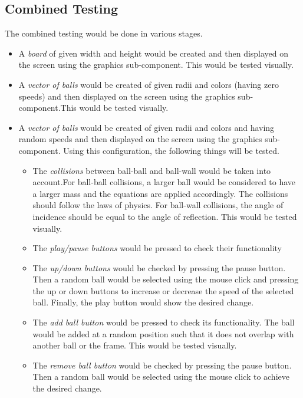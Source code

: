 \documentclass{article}
\begin{document}
\subsection{Combined Testing}
The combined testing would be done in various stages.
\begin{itemize}
\item A \textit{board} of given width and height would be created and then displayed on the screen using the graphics sub-component. This would be tested visually.
\item A \textit{vector of balls} would be created of given radii and colors (having zero speeds) and then displayed on the screen using the graphics sub-component.This would be tested visually.
\item A \textit{vector of balls} would be created of given radii and colors
and having random speeds and then displayed on the screen using the graphics sub-component. Using this configuration, the following things will be tested.
\begin{itemize}
\item The \textit{collisions} between ball-ball and ball-wall would be taken into account.For ball-ball collisions, a larger ball would be considered to have a larger mass and the equations are applied accordingly. The collisions should follow the laws of physics. For ball-wall collisions, the angle of incidence should be equal to the angle of reflection. This would be tested visually.
\item The \textit{play/pause buttons} would be pressed to check their functionality
\item The \textit{up/down buttons} would be checked by pressing the pause button. Then a random ball would be selected using the mouse click and pressing the up or down buttons to increase or decrease the speed of the selected ball. Finally, the play button would show the desired change.
\item The \textit{add ball button} would be pressed to check its functionality. The ball would be added at a random position such that it does not overlap with another ball or the frame. This would be tested visually.
\item The \textit{remove ball button} would be checked by pressing the pause button. Then a random ball would be selected using the mouse click to achieve the desired change.
\end{itemize}
\end{itemize}
\end{document}
